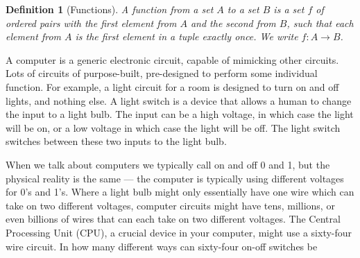 \documentclass[a4paper,hidelinks,twocolumn]{article}
\title{\topicname}
\author{\contact}
\date{}
\newtheorem*{definition}{Definition}
\begin{document}
  
    \maketitle


    \begin{definition}[Functions] A function from a set $A$ to a set $B$ is a set $f$ of ordered pairs with the first element from $A$ and the second from $B$, such that each element from $A$ is the first element in a tuple exactly once. We write $f:A \rightarrow B$.
    \end{definition}

    

  A computer is a generic electronic circuit, capable of mimicking other circuits.
  Lots of circuits of purpose-built, pre-designed to perform some individual function.
  For example, a light circuit for a room is designed to turn on and off lights, and nothing else.
  A light switch is a device that allows a human to change the input to a light bulb.
  The input can be a high voltage, in which case the light will be on, or a low voltage in which case the light will be off.
  The light switch switches between these two inputs to the light bulb.

  When we talk about computers we typically call on and off 0 and 1, but the physical reality is the same --- the computer is typically using different voltages for 0's and 1's.
  Where a light bulb might only essentially have one wire which can take on two different voltages, computer circuits might have tens, millions, or even billions of wires that can each take on two different voltages.
  The Central Processing Unit (CPU), a crucial device in your computer, might use a sixty-four wire circuit.
  In how many different ways can sixty-four on-off switches be 



  





  
\end{document}
